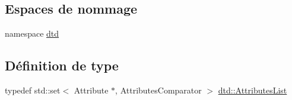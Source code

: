 \subsection*{Espaces de nommage}
\begin{DoxyCompactItemize}
\item 
namespace \hyperlink{namespacedtd}{dtd}
\end{DoxyCompactItemize}
\subsection*{Définition de type}
\begin{DoxyCompactItemize}
\item 
typedef std::set$<$ Attribute $\ast$, AttributesComparator $>$ \hyperlink{namespacedtd_a8d5d29abb5de0468925f321597f57f4b}{dtd::AttributesList}
\end{DoxyCompactItemize}
